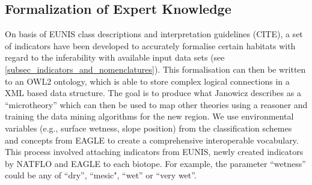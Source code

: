 \documentclass[authoryear, review,12pt,number]{elsarticle}
\begin{document}
\subsection{Formalization of Expert Knowledge}
On basis of EUNIS class descriptions and interpretation guidelines (CITE), a
set of indicators have been developed to accurately formalise certain habitats
with regard to the inferability with available input data sets (see
\ref{subsec_indicators_and_nomenclatures}). This formalisation can then be
written to an OWL2 ontology, which is able to store complex logical connections
in a XML based data structure.  The goal is to produce what Janowicz describes
as a ``microtheory'' \citep{Janowicz2012} which can then be used to map other
theories using a reasoner and training the data mining algorithms for the new
region. We use environmental variables (e.g., surface wetness, slope position)
from the classification schemes and concepts from EAGLE to create a
comprehensive interoperable vocabulary. This process involved attaching
indicators from EUNIS, newly created indicators by NATFLO and EAGLE to each
biotope. For example, the parameter ``wetness'' could be any of ``dry'',
``mesic", ``wet'' or ``very wet''. 
\end{document}
